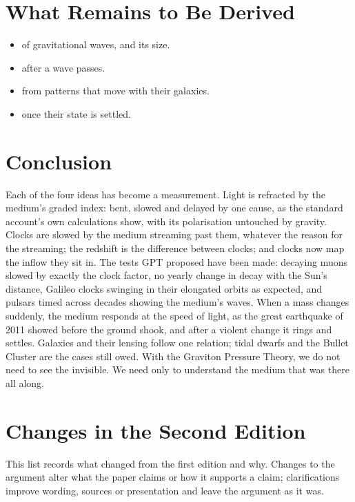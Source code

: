 \documentclass[11pt,a4paper]{article}
\begin{document}
\section{What Remains to Be Derived}

\begin{itemize}
\item {} of gravitational waves, and its size.
\item {} after a wave passes.
\item {} from patterns that move with their galaxies.
\item {} once their state is settled.
\end{itemize}

\section*{Conclusion}

Each of the four ideas has become a measurement. Light is refracted by the medium's graded index: bent, slowed and delayed by one cause, as the standard account's own calculations show, with its polarisation untouched by gravity. Clocks are slowed by the medium streaming past them, whatever the reason for the streaming; the redshift is the difference between clocks; and clocks now map the inflow they sit in. The tests GPT proposed have been made: decaying muons slowed by exactly the clock factor, no yearly change in decay with the Sun's distance, Galileo clocks swinging in their elongated orbits as expected, and pulsars timed across decades showing the medium's waves. When a mass changes suddenly, the medium responds at the speed of light, as the great earthquake of 2011 showed before the ground shook, and after a violent change it rings and settles. Galaxies and their lensing follow one relation; tidal dwarfs and the Bullet Cluster are the cases still owed. With the Graviton Pressure Theory, we do not need to see the invisible. We need only to understand the medium that was there all along.

\clearpage
\section*{Changes in the Second Edition}

This list records what changed from the first edition and why. Changes to the argument alter what the paper claims or how it supports a claim; clarifications improve wording, sources or presentation and leave the argument as it was.
\end{document}
